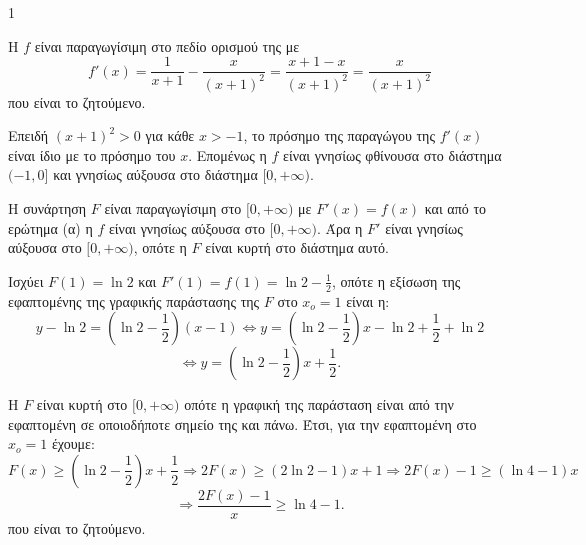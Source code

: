 \begin{ylh}{1}
    \item [Ύλη από εικόνα]
\end{ylh}
\begin{alist}
\item Η $f$ είναι παραγωγίσιμη στο πεδίο ορισμού της με
\[ f'(x) = \frac{1}{x+1} - \frac{x}{(x+1)^2} = \frac{x+1-x}{(x+1)^2} = \frac{x}{(x+1)^2} \]
που είναι το ζητούμενο.

Επειδή $(x+1)^2 > 0$ για κάθε $x > -1$, το πρόσημο της παραγώγου της $f'(x)$ είναι ίδιο με το πρόσημο του $x$. Επομένως η $f$ είναι γνησίως φθίνουσα στο διάστημα $(-1, 0]$ και γνησίως αύξουσα στο διάστημα $[0, +\infty)$.
\item Η συνάρτηση $F$ είναι παραγωγίσιμη στο $[0, +\infty)$ με $F'(x)=f(x)$ και από το ερώτημα (α) η $f$ είναι γνησίως αύξουσα στο $[0, +\infty)$. Άρα η $F'$ είναι γνησίως αύξουσα στο $[0, +\infty)$, οπότε η $F$ είναι κυρτή στο διάστημα αυτό.
\item \begin{rlist}
\item Ισχύει $F(1)=\ln2$ και $F'(1)=f(1)=\ln2 - \frac{1}{2}$, οπότε η εξίσωση της εφαπτομένης της γραφικής παράστασης της $F$ στο $x_o=1$ είναι η:
\[ y - \ln2 = \left(\ln2 - \frac{1}{2}\right)(x-1) \Leftrightarrow y = \left(\ln2 - \frac{1}{2}\right)x - \ln2 + \frac{1}{2} + \ln2 \]
\[ \Leftrightarrow y = \left(\ln2 - \frac{1}{2}\right)x + \frac{1}{2}. \]
\item Η $F$ είναι κυρτή στο $[0, +\infty)$ οπότε η γραφική της παράσταση είναι από την εφαπτομένη σε οποιοδήποτε σημείο της και πάνω. Έτσι, για την εφαπτομένη στο $x_o=1$ έχουμε:
\[ F(x) \geq \left(\ln2 - \frac{1}{2}\right)x + \frac{1}{2} \Rightarrow 2F(x) \geq (2\ln2-1)x + 1 \Rightarrow 2F(x)-1 \geq (\ln4-1)x \]
\[ \Rightarrow \frac{2F(x)-1}{x} \geq \ln4-1. \]
που είναι το ζητούμενο.
\end{rlist}
\end{alist}